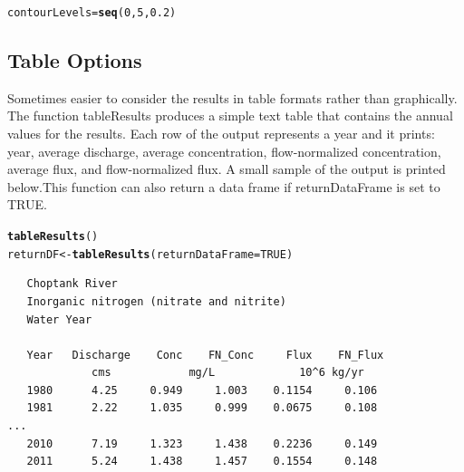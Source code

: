 \documentclass[a4paper,11pt]{article}\usepackage[]{graphicx}\usepackage[]{color}
\makeatletter
\newcommand{\hlnum}[1]{\textcolor[rgb]{0.686,0.059,0.569}{#1}}%
\newcommand{\hlstd}[1]{\textcolor[rgb]{0.345,0.345,0.345}{#1}}%
\newcommand{\hlkwb}[1]{\textcolor[rgb]{0.69,0.353,0.396}{#1}}%
\newcommand{\hlkwc}[1]{\textcolor[rgb]{0.333,0.667,0.333}{#1}}%
\newcommand{\hlkwd}[1]{\textcolor[rgb]{0.737,0.353,0.396}{\textbf{#1}}}%
\newenvironment{kframe}{%
 \def\at@end@of@kframe{}%
 \ifinner\ifhmode%
  \def\at@end@of@kframe{\end{minipage}}%
  \begin{minipage}{\columnwidth}%
 \fi\fi%
 \def\FrameCommand##1{\hskip\@totalleftmargin \hskip-\fboxsep
 \colorbox{shadecolor}{##1}\hskip-\fboxsep
     \hskip-\linewidth \hskip-\@totalleftmargin \hskip\columnwidth}%
 \MakeFramed {\advance\hsize-\width
   \@totalleftmargin\z@ \linewidth\hsize
   \@setminipage}}%
 {\par\unskip\endMakeFramed%
 \at@end@of@kframe}
\newenvironment{knitrout}{}{} %
\makeatother
\begin{document}
\begin{knitrout}
\color{fgcolor}\begin{kframe}
\begin{alltt}
\hlstd{contourLevels} \hlkwb{=} \hlkwd{seq}\hlstd{(}\hlnum{0}\hlstd{,}\hlnum{5}\hlstd{,}\hlnum{0.2}\hlstd{)}
\end{alltt}
\end{kframe}
\end{knitrout}



\FloatBarrier
\subsection{Table Options}
\label{sec:wrtdsTable}
Sometimes easier to consider the results in table formats rather than graphically. The function tableResults produces a simple text table that contains the annual values for the results.  Each row of the output represents a year and it prints: year, average discharge, average concentration, flow-normalized concentration, average flux, and flow-normalized flux.  A small sample of the output is printed below.This function can also return a data frame if returnDataFrame is set to TRUE.

\begin{knitrout}
\color{fgcolor}\begin{kframe}
\begin{alltt}
\hlkwd{tableResults}\hlstd{()}
\hlstd{returnDF} \hlkwb{<-} \hlkwd{tableResults}\hlstd{(}\hlkwc{returnDataFrame}\hlstd{=}\hlnum{TRUE}\hlstd{)}
\end{alltt}
\end{kframe}
\end{knitrout}


\begin{verbatim}
   Choptank River 
   Inorganic nitrogen (nitrate and nitrite)
   Water Year 

   Year   Discharge    Conc    FN_Conc     Flux    FN_Flux
             cms            mg/L             10^6 kg/yr 
   1980      4.25     0.949     1.003    0.1154     0.106
   1981      2.22     1.035     0.999    0.0675     0.108
...
   2010      7.19     1.323     1.438    0.2236     0.149
   2011      5.24     1.438     1.457    0.1554     0.148
\end{verbatim}
\end{document}

